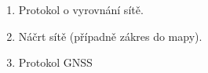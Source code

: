 \begin{enumerate}
    \item Protokol o vyrovnání sítě.
    \item Náčrt sítě (případně zákres do mapy).
    \item Protokol GNSS
\end{enumerate}


